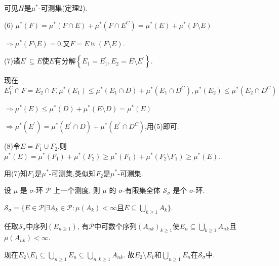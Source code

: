 \begin{solution}
可见$H$是$\mu^*$-可测集(定理2).

(6) $\mu^{*}(F)=\mu^{*}(F\cap E)+\mu^{*}(F\cap E^C)=\mu^{*}(E)+\mu^{*}(F\setminus E)$

$\Rightarrow \mu^{*}(F\setminus E)=0$.又$F=E\uplus(F\setminus E).$

(7)诸$E^{\prime}\subseteq E$使$E$有分解$\left\{E_1=E_1^{\prime},E_2=E\setminus E^{\prime}\right\}$.

现在$E_1^{C}\cap F=E_2\cap F,\mu^*(E_1)\leqslant\mu^*(E_1\cap D)+\mu^*(E_1\cap D^C),\mu^*(E_2)\leqslant\mu^*(E_2\cap D^C)$

$\Rightarrow\mu^*(E)\leqslant\mu^*(D)+\mu^*(E\setminus D)=\mu^*(E)$

$\Rightarrow\mu^*(E^{\prime})=\mu^*(E^{\prime}\cap D)+\mu^*(E^{\prime}\cap D^C)$,用(5)即可.

(8)令$E=F_{1}\cup F_{2}$,则$\mu^*(E)=\mu^*(F_{1})+\mu^*(F_{2})\geqslant \mu^*(F_{1})+\mu^*(F_{2}\setminus F_1)\geqslant\mu^*(E).$

用(7)知$F_1$是$\mu^*$-可测集,类似知$F_2$是$\mu^*$-可测集.
\end{solution}


\begin{3}
设 $\mu$ 是 $\sigma$-环 $\mathcal{P}$ 上一个测度, 
则 $\mu$ 的 $\sigma$-有限集全体 $\mathcal{S}_\sigma$ 是个 $\sigma$-环.
\end{3}   
\begin{solution}
$\mathcal{S}_{\sigma}=\{E\in\mathcal{P}|\exists A_k\in\mathcal{P}:\mu(A_k)<\infty$且$E\subseteq\bigcup\limits_{k\geqslant1}A_k\}$.

任取$\mathcal{S}_{\sigma}$中序列$(E_{n\geqslant1})$, 
有$\mathcal{P}$中可数个序列$(A_{nk})_{k\geqslant1}$使$E_n\subseteq\bigcup\limits_{k\geqslant1}A_{nk}$且$\mu(A_{nk})<\infty.$

现在$E_2\setminus E_1\subseteq\bigcup\limits_{n\geqslant1}E_n\subseteq\bigcup\limits_{n,k\geqslant1}A_{nk}$. 
故$E_2\setminus E_1$和$\bigcup\limits_{n\geqslant1}E_n$在$\mathcal{S}_{\sigma}$中.
\end{solution}


